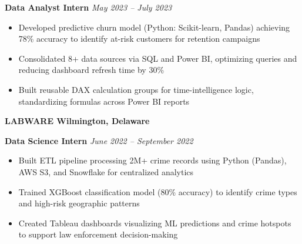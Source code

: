 \documentclass[10pt]{article}
\begin{document}
\noindent \textbf{Data Analyst Intern} \hfill \textit{May 2023 -- July 2023}
\begin{itemize}[leftmargin=*, label={•},nosep]

\vspace{0.1cm}

\item Developed predictive churn model (Python: Scikit-learn, Pandas) achieving 78\% accuracy to identify at-risk customers for retention campaigns

\vspace{0.1cm}

\item Consolidated 8+ data sources via SQL and Power BI, optimizing queries and reducing dashboard refresh time by 30\%

\vspace{0.1cm}

\item Built reusable DAX calculation groups for time-intelligence logic, standardizing formulas across Power BI reports



\end{itemize}
\vspace{0.45cm}
\noindent\textbf{LABWARE \hfill Wilmington, Delaware}

\noindent \textbf{Data Science Intern} \hfill \textit{June 2022 -- September 2022}

\begin{itemize}[leftmargin=*, label={•},nosep]

\vspace{0.1cm}

\item Built ETL pipeline processing 2M+ crime records using Python (Pandas), AWS S3, and Snowflake for centralized analytics

\vspace{0.1cm}

\item Trained XGBoost classification model (80\% accuracy) to identify crime types and high-risk geographic patterns

\vspace{0.1cm}
\item Created Tableau dashboards visualizing ML predictions and crime hotspots to support law enforcement decision-making

\end{itemize}
\vspace{0.4cm}
\end{document}
